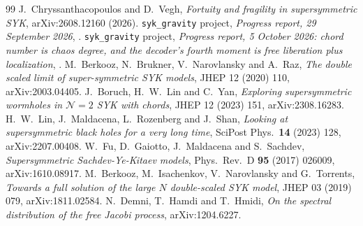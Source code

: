 \documentclass[11pt]{article}
\theoremstyle{plain}
\theoremstyle{remark}
\numberwithin{equation}{section}
\begin{document}
\begin{thebibliography}{99}\small
{} J.~Chryssanthacopoulos and D.~Vegh, \emph{Fortuity and fragility in supersymmetric SYK}, arXiv:2608.12160 (2026).
 \texttt{syk\_gravity} project, \emph{Progress report, 29 September 2026}, .
 \texttt{syk\_gravity} project, \emph{Progress report, 5 October 2026: chord number is chaos degree, and the decoder's fourth moment is free liberation plus localization}, .
 M.~Berkooz, N.~Brukner, V.~Narovlansky and A.~Raz, \emph{The double scaled limit of super-symmetric SYK models}, JHEP 12 (2020) 110, arXiv:2003.04405.
 J.~Boruch, H.~W.~Lin and C.~Yan, \emph{Exploring supersymmetric wormholes in $\mathcal N=2$ SYK with chords}, JHEP 12 (2023) 151, arXiv:2308.16283.
 H.~W.~Lin, J.~Maldacena, L.~Rozenberg and J.~Shan, \emph{Looking at supersymmetric black holes for a very long time}, SciPost Phys.\ \textbf{14} (2023) 128, arXiv:2207.00408.
 W.~Fu, D.~Gaiotto, J.~Maldacena and S.~Sachdev, \emph{Supersymmetric Sachdev-Ye-Kitaev models}, Phys.\ Rev.\ D \textbf{95} (2017) 026009, arXiv:1610.08917.
 M.~Berkooz, M.~Isachenkov, V.~Narovlansky and G.~Torrents, \emph{Towards a full solution of the large $N$ double-scaled SYK model}, JHEP 03 (2019) 079, arXiv:1811.02584.
 N.~Demni, T.~Hamdi and T.~Hmidi, \emph{On the spectral distribution of the free Jacobi process}, arXiv:1204.6227.
\end{thebibliography}
\end{document}
